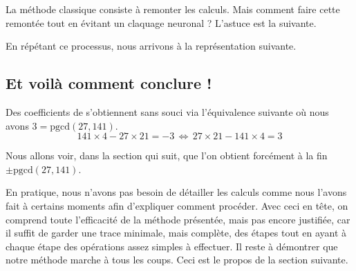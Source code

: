 La méthode classique consiste à remonter les calculs. Mais comment faire cette remontée tout en évitant un claquage neuronal ? L'astuce est la suivante.

\vfill\newpage

\begin{multicols}{2}

	\columnbreak
	
\end{multicols}




\medskip


\vfill\newpage

En répétant ce processus, nous arrivons à la représentation suivante.





\subsection{Et voilà comment conclure !}



\medskip


Des coefficients de \bb{} s'obtiennent sans souci via l'équivalence suivante où nous avons $3 = \mathrm{pgcd}(27 , 141)$.
\[141 \times 4 - 27 \times 21 = -3 \,\Longleftrightarrow\, 27 \times 21 - 141 \times 4 = 3\]


\medskip


Nous allons voir, dans la section qui suit, que l'on obtient forcément à la fin $\pm \mathrm{pgcd}(27 , 141)$. 


\medskip


En pratique, nous n'avons pas besoin de détailler les calculs comme nous l'avons fait à certains moments afin d'expliquer comment procéder.
Avec ceci en tête, on comprend toute l'efficacité de la méthode présentée, mais pas encore justifiée, car il suffit de garder une trace minimale, mais complète, des étapes tout en ayant à chaque étape des opérations assez simples à effectuer.
Il reste à démontrer que notre méthode marche à tous les coups. Ceci est le propos de la section suivante.
	